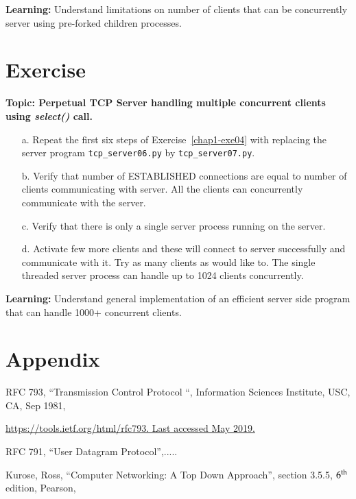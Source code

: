 \begin{multicols}{2}
\textbf{Learning:} Understand limitations on number of clients that can be concurrently server using pre-forked children processes.

\section*{Exercise \label{chap1-exe05}}

\textbf{Topic: Perpetual TCP Server handling multiple concurrent clients using \textit{select()} call.}

\begin{itemize}

\item[a.] Repeat the first six steps of Exercise~\ref{chap1-exe04} with replacing the server program \texttt{tcp\_server06.py} by \texttt{tcp\_server07.py}.

\item[b.] Verify that number of ESTABLISHED connections are equal to number of clients communicating with server. All the clients can concurrently communicate with the server.

\item[c.] Verify that there is only a single server process running on the server.

\item[d.] Activate few more clients and these will connect to server successfully and communicate with it. Try as many clients as would like to. The single threaded server process can handle up to 1024 clients concurrently.
\end{itemize}

\textbf{Learning:} Understand general implementation of an efficient server side program that can handle 1000+ concurrent clients.

\section*{Appendix}

\begin{thebibliography}{99}
 RFC 793, “Transmission Control Protocol “, Information Sciences Institute, USC, CA, Sep 1981, 

\url{https://tools.ietf.org/html/rfc793. Last accessed May 2019.}

 RFC 791, “User Datagram Protocol”,.....

Kurose, Ross, “Computer Networking: A Top Down Approach”, section 3.5.5, $6^{\rm th}$ edition, Pearson,


\end{thebibliography}
\end{multicols}
